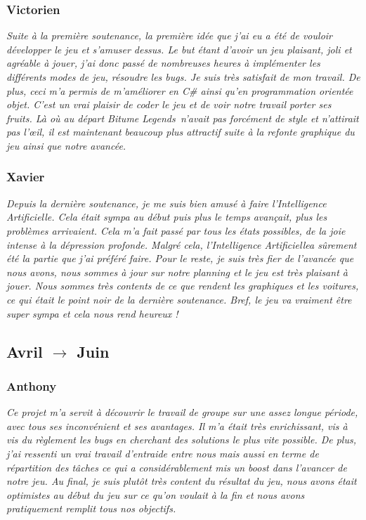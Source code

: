 \documentclass[a4paper,12pt]{article}
\newcommand{\btmlgs}{\textsl{Bitume Legends}}
\newcommand{\AI}{Intelligence Artificielle}
\begin{document}
            \subsubsection{Victorien}
                \textit{Suite à la première soutenance, la première idée que j'ai eu a été
                de vouloir développer le jeu et s'amuser dessus. Le but étant
                d'avoir un jeu plaisant, joli et agréable à jouer, j'ai donc passé
                de nombreuses heures à implémenter les différents modes de jeu, résoudre les 
                \textsl{bugs}. 
                Je suis très satisfait de mon travail. De plus, ceci m'a permis de m'améliorer en 
                \textsl{C\#} ainsi qu'en programmation orientée objet. C'est un vrai plaisir de coder 
                le jeu et de voir notre travail
                porter ses fruits. Là où au départ \btmlgs\, n'avait pas forcément de style et
                n'attirait pas l'œil, il est maintenant beaucoup plus attractif suite à
                la refonte graphique du jeu ainsi que notre avancée.}

            \subsubsection{Xavier}
                \textit{Depuis la dernière soutenance, je me suis bien amusé à faire l'\AI.
                Cela était sympa au début puis plus le temps avançait, plus les problèmes arrivaient.
                Cela m'a fait passé par tous les états possibles, de la joie intense à la dépression
                profonde. Malgré cela, l'\AI\;a sûrement été la partie que j'ai préféré faire.
                Pour le reste, je suis très fier de l'avancée que nous avons, nous sommes à jour sur 
                notre planning et le jeu est très plaisant à jouer. Nous sommes très contents de ce que 
                rendent les graphiques et les voitures, ce qui était le point noir de la dernière 
                soutenance. Bref, le jeu va vraiment être super sympa et cela nous rend heureux ! }
                
     \subsection{Avril $\to$ Juin}
         \subsubsection{Anthony}
         \textit{Ce projet m'a servit à découvrir le travail de groupe sur une assez longue période, avec tous ses inconvénient et ses avantages. Il m'a était très enrichissant, vis à vis du règlement les bugs en cherchant des solutions le plus vite possible. De plus, j'ai ressenti un vrai travail d'entraide entre nous mais aussi en terme de répartition des tâches ce qui a considérablement mis un boost dans l'avancer de notre jeu. Au final, je suis plutôt très content du résultat du jeu, nous avons était optimistes au début du jeu sur ce qu'on voulait à la fin et nous avons pratiquement remplit tous nos objectifs. }
             
\end{document}

